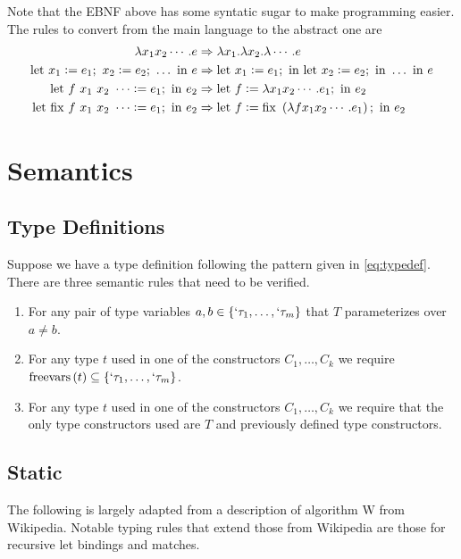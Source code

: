 \documentclass[12pt]{article}
\newcommand{\freevars}[1]{\mathrm{freevars}\del{#1}}
\newcommand{\thmlet}[2]{\mathrm{let}~#1~\mathrm{in}~#2}
\newcommand{\thmfix}{\mathrm{fix}}
\begin{document}
Note that the EBNF above has some syntatic sugar to make programming
easier.
The rules to convert from the main language to the abstract one are
\begin{align}
  \lambda x_1 x_2 \cdots. e
  &\Rightarrow \lambda x_1. \lambda x_2. \lambda \cdots. e\\
  \thmlet{x_1 := e_1;~x_2 := e_2;~\ldots}{e}
  &\Rightarrow \thmlet{x_1 := e_1;}{\thmlet{x_2 := e_2;}{\ldots~\mathrm{in}~e}}\\
  \thmlet{f~x_1~x_2~\cdots := e_1;}{e_2}
  &\Rightarrow \thmlet{f := \lambda x_1 x_2 \cdots. e_1;}{e_2}\\
  \thmlet{\thmfix~f~x_1~x_2~\cdots := e_1;}{e_2}
  &\Rightarrow \thmlet{f := \thmfix~\del{\lambda f x_1 x_2 \cdots. e_1};}{e_2}
\end{align}


\section{Semantics}
\label{app:semantics}


\subsection{Type Definitions}
\label{sec:type_defs}

Suppose we have a type definition following the pattern given in
\eqref{eq:typedef}.
There are three semantic rules that need to be verified.
\begin{enumerate}
\item For any pair of type variables
  $a, b \in \cbr{`\tau_1,\ldots,`\tau_m}$ that $T$ parameterizes over
  $a \neq b$.

\item For any type $t$ used in one of the constructors
  $C_1,\ldots,C_k$ we require
  $\freevars{t} \subseteq \cbr{`\tau_1,\ldots,`\tau_m}$.

\item For any type $t$ used in one of the constructors
  $C_1,\ldots,C_k$ we require that the only type constructors used are
  $T$ and previously defined type constructors.
\end{enumerate}


\subsection{Static}
\label{sec:static_semantics}

The following is largely adapted from a description of algorithm W
from Wikipedia\cite{wikiAlgW}.
Notable typing rules that extend those from Wikipedia are those for
recursive let bindings and matches.
\end{document}

